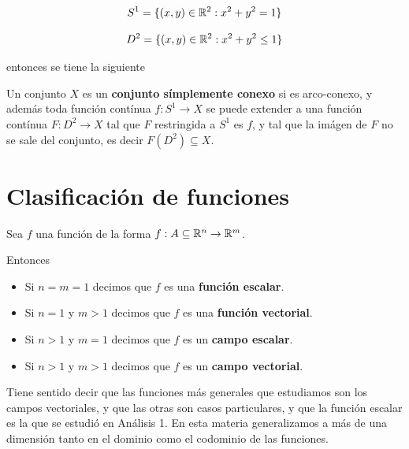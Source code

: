$$ S^1 = \{(x,y) \in \mathbb{R}^2 : x^2 + y^2 = 1 \} $$

$$ D^2 = \{(x,y) \in \mathbb{R}^2 : x^2 + y^2 \leq 1 \} $$

entonces se tiene la siguiente

\begin{definition}
Un conjunto $X$ es un \textbf{conjunto símplemente conexo}  si es arco-conexo, y además toda función contínua $f : S^1 \to X$ se puede extender a una función contínua $F : D^2 \to X$ tal que $F$ restringida a $S^1$ es $f$, y tal que la imágen de $F$ no se sale del conjunto, es decir $F(D^2) \subseteq X$.
\end{definition}

\section{Clasificación de funciones}

\begin{definition}
Sea $f$ una función de la forma $ f : A \subseteq \mathbb{R}^n \to \mathbb{R}^m$.  

Entonces

\begin{itemize}
\item Si $n=m=1$ decimos que $f$ es una \textbf{función escalar}. 

\item Si $n=1$ y $m>1$ decimos que $f$ es una \textbf{función vectorial}. 

\item Si $n>1$ y $m=1$ decimos que $f$ es un \textbf{campo escalar}. 

\item Si $n>1$ y $m>1$ decimos que $f$ es un \textbf{campo vectorial}. 
\end{itemize}

\end{definition}

Tiene sentido decir que las funciones más generales que estudiamos son los campos vectoriales, y que las otras son casos particulares, y que la función escalar es la que se estudió en Análisis 1.  En esta materia generalizamos a más de una dimensión tanto en el dominio como el codominio de las funciones.

